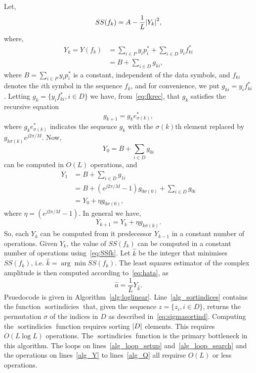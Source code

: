 \documentclass[a4paper,10pt]{article}
\begin{document}
Let,
\begin{equation}\label{eq:SSfk}
SS(f_k) = A - \frac{1}{L}{\left| Y_k \right|}^2,
\end{equation}
where, 
\begin{align*}
Y_k = Y( f_k ) &= \sum_{i \in P} y_i p_i^*  + \sum_{i \in D} y_i f_{ki}^* \\
&= B + \sum_{i \in D}g_{ki},
\end{align*}
where $B = \sum_{i \in P} y_i p_i^*$ is a constant, independent of the data symbols, and $f_{ki}$ denotes the $i$th symbol in the sequence $f_k$, and for convenience, we put $g_{ki}  = y_i f_{ki}^*$.  Letting $g_{k} =\{ y_i f_{ki}^*, i \in D\}$ we have, from~\eqref{eq:fkrec}, that $g_k$ satisfies the recursive equation
\[
g_{k+1} = g_{k} e_{\sigma(k)}^*,
\]
where $g_{k} e_{\sigma(k)}^*$ indicates the sequence $g_k$ with the $\sigma(k)$th element replaced by $g_{k \sigma(k)}e^{j2\pi/M}$.  Now,
\[
Y_0 = B + \sum_{i \in D} g_{0i}
\] 
can be computed in $O(L)$ operations, and
\begin{align*}
Y_1 &= B + \sum_{i \in D} g_{1i} \\
&= B +  (e^{j2\pi/M} - 1)g_{0\sigma(0)} + \sum_{i \in D} g_{0i} \\
&= Y_0 + \eta g_{0\sigma(0)},
\end{align*}
where $\eta = (e^{j2\pi/M} - 1)$.  In general we have,
\[
Y_{k+1} = Y_k + \eta g_{k\sigma(k)}.
\]
So, each $Y_k$ can be computed from it predecessor $Y_{k-1}$ in a constant number of operations.  Given $Y_k$, the value of $SS(f_k)$ can be computed in a constant number of operations using~\eqref{eq:SSfk}.  Let $\hat{k}$ be the integer that minimises $SS(f_k)$, i.e. $\hat{k} = \arg\min SS(f_k)$.  The least squares estimator of the complex amplitude is then computed according to~\eqref{eq:hata}, as 
\begin{equation}\label{eq:ahatYhat}
\hat{a} = \frac{1}{L} Y_{\hat{k}}.
\end{equation}
Psuedocode is given in Algorithm~\ref{alg:loglinear}.  Line~\ref{alg_sortindices} contains the function $\operatorname{sortindicies}$ that, given the sequence $z = \{z_i, i \in D\}$, returns the permutation $\sigma$ of the indices in $D$ as described in~\eqref{eq:sigmasortind}.  Computing the $\operatorname{sortindicies}$ function requires sorting ${\left| D \right|}$ elements.  This requires $O(L \log L)$ operations.  The $\operatorname{sortindicies}$ function is the primary bottleneck in this algorithm.  The loops on lines~\ref{alg_loop_setup} and~\ref{alg_loop_search} and the operations on lines~\ref{alg_Y} to lines~\ref{alg_Q} all requirse $O(L)$ or less operations.  %
\end{document}
